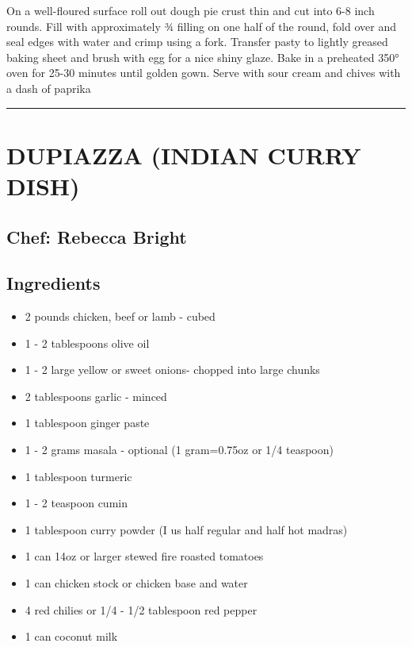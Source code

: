 \documentclass[
]{book}
\providecommand{\tightlist}{%
  \setlength{\itemsep}{0pt}\setlength{\parskip}{0pt}}
\begin{document}
On a well-floured surface roll out dough pie crust thin and cut into 6-8 inch rounds. Fill with approximately ¾ filling on one half of the round, fold over and seal edges with water and crimp using a fork. Transfer pasty to lightly greased baking sheet and brush with egg for a nice shiny glaze. Bake in a preheated 350° oven for 25-30 minutes until golden gown. Serve with sour cream and chives with a dash of paprika

\begin{center}\rule{0.5\linewidth}{0.5pt}\end{center}

\hypertarget{dupiazza-indian-curry-dish}{%
\section*{DUPIAZZA (INDIAN CURRY DISH)}\label{dupiazza-indian-curry-dish}}


\hypertarget{chef-rebecca-bright-2}{%
\subsection*{Chef: Rebecca Bright}\label{chef-rebecca-bright-2}}


\hypertarget{ingredients-54}{%
\subsection*{Ingredients}\label{ingredients-54}}


\begin{itemize}
\tightlist
\item
  2 pounds chicken, beef or lamb - cubed
\item
  1 - 2 tablespoons olive oil
\item
  1 - 2 large yellow or sweet onions- chopped into large chunks
\item
  2 tablespoons garlic - minced
\item
  1 tablespoon ginger paste
\item
  1 - 2 grams masala - optional (1 gram=0.75oz or 1/4 teaspoon)
\item
  1 tablespoon turmeric
\item
  1 - 2 teaspoon cumin
\item
  1 tablespoon curry powder (I us half regular and half hot madras)
\item
  1 can 14oz or larger stewed fire roasted tomatoes
\item
  1 can chicken stock or chicken base and water
\item
  4 red chilies or 1/4 - 1/2 tablespoon red pepper
\item
  1 can coconut milk
\end{itemize}
\end{document}
